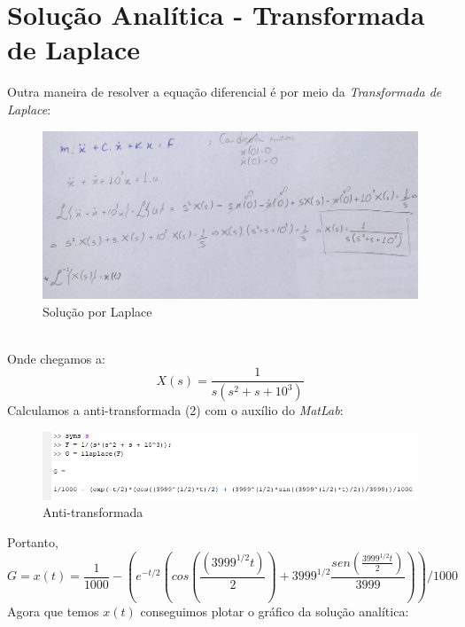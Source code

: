 \documentclass[a4paper, 12pt]{article}
\begin{document}
\section{Solução Analítica - Transformada de Laplace}
	Outra maneira de resolver a equação diferencial é por meio da \textit{Transformada de Laplace}:
	\begin{figure}[h]
		\center
		\includegraphics[scale=0.55]{Imagens/la.png}
		\caption{Solução por Laplace}
	\end{figure}\\
	Onde chegamos a:
	\begin{equation}
		X(s) = \frac{1}{s(s^2 + s + 10^3)}
	\end{equation}
	Calculamos a anti-transformada (2) com o auxílio do \textit{MatLab}:
	\begin{figure}[h]
		\center
		\includegraphics[scale=0.7]{Imagens/ma.png}
		\caption{Anti-transformada}
	\end{figure}
	\newpage
	Portanto,\\
	\begin{equation}
		G = x(t) = \frac{1}{1000} - (e^{-t/2}(cos(\frac{(3999^{1/2}t)}{2}) + 3999^{1/2}\frac{sen(\frac{3999^{1/2}t}{2})}{3999}))/1000
	\end{equation}
	Agora que temos $x(t)$ conseguimos plotar o gráfico da solução analítica:
\end{document}

